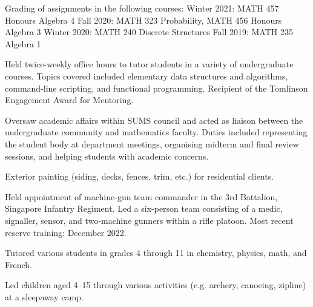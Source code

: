 \smallskip
Grading of assignments in the following courses:
\begingroup\parindent=10pt
\smallskip
\thing Winter 2021: MATH 457 Honours Algebra 4
\smallskip
\thing Fall 2020: MATH 323 Probability, MATH 456 Honours Algebra 3
\smallskip
\thing Winter 2020: MATH 240 Discrete Structures
\smallskip
\thing Fall 2019: MATH 235 Algebra 1
\endgroup
\medbreak

\smallskip
Held twice-weekly office hours to tutor students in a variety of undergraduate courses.
Topics covered included elementary data structures and algorithms, command-line scripting,
and functional programming. Recipient of the Tomlinson Engagement Award for Mentoring.
\medbreak

\smallskip
Oversaw academic affairs within SUMS council and acted as liaison between the undergraduate community and
mathematics faculty. Duties included representing the student body at department meetings,
organising midterm and final review sessions,
and helping students with
academic concerns.
\medbreak

\smallskip
Exterior painting (siding, decks, fences, trim, etc.) for residential clients.
\medbreak

\smallskip
Held appointment of machine-gun team commander in the 3rd Battalion, Singapore Infantry Regiment.
Led a six-person team consisting of a medic, signaller, sensor, and two-machine gunners within a rifle platoon.
Most recent reserve training: December 2022.
\medbreak

\smallskip
Tutored various students in grades 4 through 11 in chemistry, physics, math, and French.
\medbreak

\smallskip
Led children aged 4--15 through various activities (e.g. archery, canoeing, zipline) at a sleepaway camp.
\medbreak

